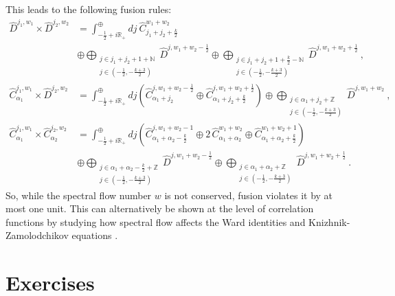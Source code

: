 \documentclass[12pt,a4paper,notitlepage]{report}
\newcommand \Z {\mathbb{Z}}
\newcommand \N {\mathbb{N}}
\newcommand \R {\mathbb{R}}
\numberwithin{equation}{section}
\theoremstyle{break}
\begin{document}
This leads to the following fusion rules:
\begin{align}
\hat{D}^{j_1,w_1}\times \hat{D}^{j_2,w_2} &= \int^\oplus_{-\frac12+i\R_+} dj\ \hat{C}^{w_1+w_2}_{j_1+j_2+\frac{k}{2}} 
\nonumber \\ & \oplus 
\bigoplus_{\substack{j\in j_1+j_2+1+\N \\ j\in (-\frac12,-\frac{k+3}{2})}} \hat{D}^{j,w_1+w_2-\frac12} \oplus 
\bigoplus_{\substack{j\in j_1+j_2+1+\frac{k}{2}-\N \\ j\in (-\frac12,-\frac{k+3}{2})}} \hat{D}^{j,w_1+w_2+\frac12}\ ,
\\
 \hat{C}^{j_1,w_1}_{\alpha_1}\times \hat{D}^{j_2,w_2} &= \int^\oplus_{-\frac12+i\R_+} dj\left( \hat{C}^{j,w_1+w_2-\frac12}_{\alpha_1+j_2} \oplus \hat{C}^{j,w_1+w_2+\frac12}_{\alpha_1+j_2+\frac{k}{2}}\right) \oplus \bigoplus_{\substack{j\in \alpha_1+j_2+\Z \\ j\in (-\frac12,-\frac{k+3}{2})}} \hat{D}^{j,w_1+w_2}\ ,
\\
 \hat{C}^{j_1,w_1}_{\alpha_1}\times \hat{C}^{j_2,w_2}_{\alpha_2} &= \int^\oplus_{-\frac12+i\R_+} dj \left(\hat{C}^{j,w_1+w_2-1}_{\alpha_1+\alpha_2-\frac{k}{2}} \oplus 2\, \hat{C}^{w_1+w_2}_{\alpha_1+\alpha_2} \oplus \hat{C}^{w_1+w_2+1}_{\alpha_1+\alpha_2+\frac{k}{2}}\right) 
\nonumber \\
&\oplus \bigoplus_{\substack{j\in \alpha_1+\alpha_2-\frac{k}{2}+\Z \\ j\in(-\frac12,-\frac{k+3}{2})}} \hat{D}^{j,w_1+w_2-\frac12} 
\oplus \bigoplus_{\substack{j\in \alpha_1+\alpha_2+\Z \\ j\in(-\frac12,-\frac{k+3}{2})}} \hat{D}^{j,w_1+w_2+\frac12} \ .
\end{align}
So, while the spectral flow number $w$ is not conserved, fusion violates it by at most one unit. This can alternatively be shown at the level of correlation functions by studying how spectral flow affects the Ward identities and Knizhnik-Zamolodchikov equations \cite{rib05}.


\section{Exercises}
\end{document}

